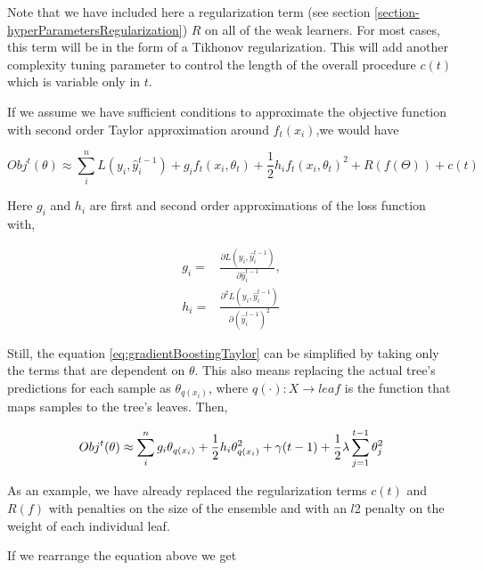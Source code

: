 Note that we have included here a regularization term (see section \cref{section-hyperParametersRegularization}) $R$ on all of the weak learners. For most cases, this term will be in the form of a Tikhonov regularization. This will add another complexity tuning parameter to control the length of the overall procedure $c(t)$ which is variable only in $t$.

If we assume we have sufficient conditions to approximate the objective function with second order Taylor approximation around $f_t(x_i)$,we would have

\begin{equation}\label{eq:gradientBoostingTaylor}
Obj^t(\theta) \approx \sum_i^n {L(y_i, \hat{y}^{t-1}_i) + g_i f_t(x_i,\theta_t) + \frac{1}{2} h_i {f_t(x_i,\theta_t)}^2 } + R(f(\Theta)) + c(t)
\end{equation}

Here $g_i$ and $h_i$ are first and second order approximations of the loss function with,

\begin{equation}
\begin{split}
g_i = & \frac{\partial L(y_i, \hat{y}^{t-1}_i)}{\partial \hat{y}^{t-1}_i},  \\
h_i = & \frac{\partial^2 L(y_i, \hat{y}^{t-1}_i)}{\partial {(\hat{y}^{t-1}_i)}^2 }
\end{split}
\end{equation}

Still, the equation \cref{eq:gradientBoostingTaylor} can be simplified by taking only the terms that are dependent on $\theta$. This also means replacing the actual tree's predictions for each sample as $\theta_{q(x_i)}$, where $q(\cdot): X \rightarrow leaf$ is the function that maps samples to the tree's leaves. Then,


\begin{equation}\label{eq:gb-objSteps1}
Obj^t(\theta) \approx \sum_i^n {g_i \theta_{q(x_i)} + \frac{1}{2} h_i \theta_{q(x_i)}^2 } + \gamma ({t-1}) + \frac{1}{2}\lambda \sum_{j=1}^{t-1} \theta_j^2 \\
\end{equation}

As an example, we have already replaced the regularization terms $c(t)$ and $R(f)$ with penalties on the size of the ensemble and with an $l$2 penalty on the weight of each individual leaf.

If we rearrange the equation above we get

